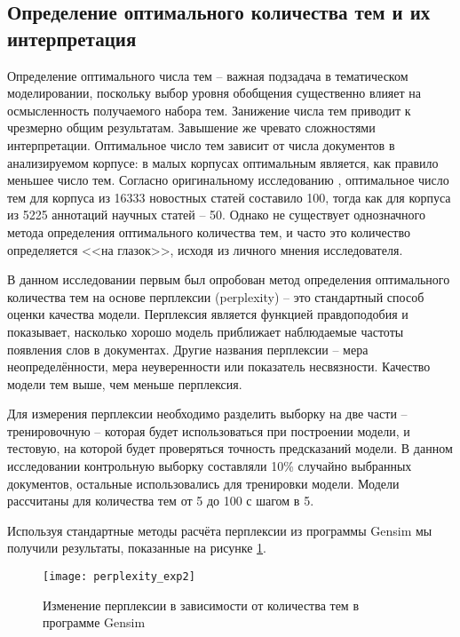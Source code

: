 \subsection{Определение оптимального количества тем и их интерпретация}
Определение оптимального числа тем -- важная подзадача в тематическом моделировании, поскольку выбор уровня обобщения существенно влияет на осмысленность получаемого набора тем. Занижение числа тем приводит к чрезмерно общим результатам. Завышение же чревато сложностями интерпретации. Оптимальное число тем зависит от числа документов в анализируемом корпусе: в малых корпусах оптимальным является, как правило меньшее число тем. Согласно оригинальному исследованию \cite{LDAOrigin}, оптимальное число тем для корпуса из 16333 новостных статей составило 100, тогда как для корпуса из 5225 аннотаций научных статей -- 50. Однако не существует однозначного метода определения оптимального количества тем, и часто это количество определяется <<на глазок>>, исходя из личного мнения исследователя. 

В данном исследовании первым был опробован метод определения оптимального количества тем на основе перплексии (perplexity) -- это стандартный способ оценки качества модели. Перплексия является функцией правдоподобия и показывает, насколько хорошо модель приближает наблюдаемые частоты появления слов в документах. Другие названия перплексии -- мера неопределённости, мера неуверенности или показатель несвязности. Качество модели тем выше, чем меньше перплексия.

Для измерения перплексии необходимо разделить выборку на две части -- тренировочную -- которая будет использоваться при построении модели, и тестовую, на которой будет проверяться точность предсказаний модели. В данном исследовании контрольную выборку составляли 10\% случайно выбранных документов, остальные использовались для тренировки модели. Модели рассчитаны для количества тем от 5 до 100 с шагом в 5.

Используя стандартные методы расчёта перплексии из программы Gensim мы получили результаты, показанные на рисунке \ref{fig:perplexity_gensim}.

\begin{figure}
	\centering
    \texttt{[image: perplexity\_exp2]}
    \caption{Изменение перплексии в зависимости от количества тем в программе Gensim}
    \label{fig:perplexity_gensim}
\end{figure}

